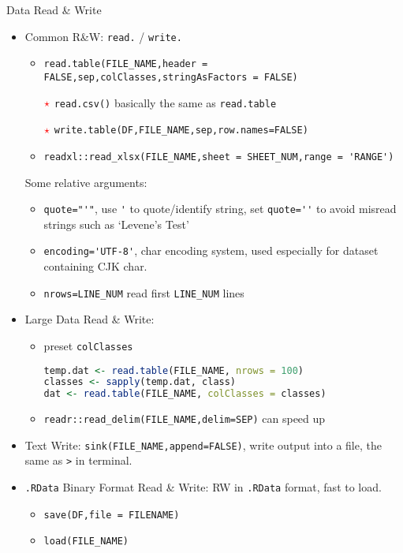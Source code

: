     
\begin{point}
    Data Read \& Write
\end{point}
\begin{itemize}[topsep=2pt,itemsep=0pt]
    \item Common R\&W: \lstinline|read.| / \lstinline|write.|
    \begin{itemize}[topsep=2pt,itemsep=0pt]
        \item \lstinline|read.table(FILE_NAME,header = FALSE,sep,colClasses,stringAsFactors = FALSE)|
        \item[${\color{red}\star }$] \lstinline|read.csv()| basically the same as \lstinline|read.table|
        \item[${\color{red}\star }$] \lstinline|write.table(DF,FILE_NAME,sep,row.names=FALSE)|
        \item \lstinline|readxl::read_xlsx(FILE_NAME,sheet = SHEET_NUM,range = 'RANGE')|
    \end{itemize}

    Some relative arguments:
    \begin{itemize}[topsep=2pt,itemsep=0pt]
        \item \lstinline|quote="'"|, use \lstinline|'| to quote/identify string, set \lstinline|quote=''| to avoid misread strings such as `Levene's Test'
        \item \lstinline|encoding='UTF-8'|, char encoding system, used especially for dataset containing CJK char.
        \item \lstinline|nrows=LINE_NUM| read first \lstinline|LINE_NUM| lines
    \end{itemize}

    \item Large Data Read \& Write: 
    \begin{itemize}[topsep=2pt,itemsep=0pt]
        \item preset \lstinline|colClasses|
        
\begin{lstlisting}[language=R]
temp.dat <- read.table(FILE_NAME, nrows = 100)
classes <- sapply(temp.dat, class)
dat <- read.table(FILE_NAME, colClasses = classes)
\end{lstlisting}
        \item \lstinline|readr::read_delim(FILE_NAME,delim=SEP)| can speed up
    \end{itemize}
    
    \item Text Write: \lstinline|sink(FILE_NAME,append=FALSE)|, write output into a file, the same as \lstinline|>| in terminal.
    \item \lstinline|.RData| Binary Format Read \& Write: RW in \lstinline|.RData| format, fast to load.
    \begin{itemize}[topsep=2pt,itemsep=0pt]
        \item \lstinline|save(DF,file = FILENAME)|
        \item \lstinline|load(FILE_NAME)|
    \end{itemize}
\end{itemize}

